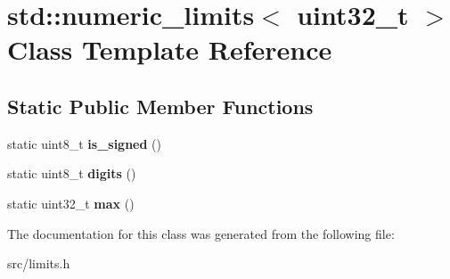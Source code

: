 \hypertarget{classstd_1_1numeric__limits_3_01uint32__t_01_4}{}\section{std\+:\+:numeric\+\_\+limits$<$ uint32\+\_\+t $>$ Class Template Reference}
\label{classstd_1_1numeric__limits_3_01uint32__t_01_4}
\subsection*{Static Public Member Functions}
\begin{DoxyCompactItemize}
\item 
\hypertarget{classstd_1_1numeric__limits_3_01uint32__t_01_4_a2c715b5f8e13692213b7c8d1337717e1}{}\label{classstd_1_1numeric__limits_3_01uint32__t_01_4_a2c715b5f8e13692213b7c8d1337717e1} 
static uint8\+\_\+t {\bfseries is\+\_\+signed} ()
\item 
\hypertarget{classstd_1_1numeric__limits_3_01uint32__t_01_4_a604671cc5e0cb48eb133906ba5e7fd33}{}\label{classstd_1_1numeric__limits_3_01uint32__t_01_4_a604671cc5e0cb48eb133906ba5e7fd33} 
static uint8\+\_\+t {\bfseries digits} ()
\item 
\hypertarget{classstd_1_1numeric__limits_3_01uint32__t_01_4_ab5d9839e9ca082865d042809aaf5c2d9}{}\label{classstd_1_1numeric__limits_3_01uint32__t_01_4_ab5d9839e9ca082865d042809aaf5c2d9} 
static uint32\+\_\+t {\bfseries max} ()
\end{DoxyCompactItemize}


The documentation for this class was generated from the following file\+:\begin{DoxyCompactItemize}
\item 
src/limits.\+h\end{DoxyCompactItemize}
